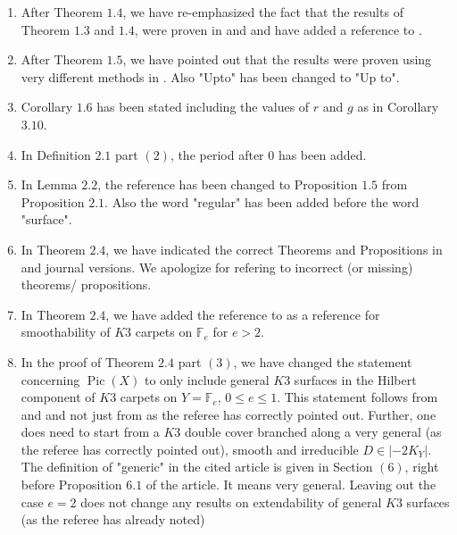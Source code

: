 \documentclass[11pt,twoside]{amsart}
\theoremstyle{plain}
\numberwithin{equation}{section}
\theoremstyle{definition}
\begin{document}
\begin{enumerate}

\item[$(1)$] After Theorem $1.4$, we have re-emphasized the fact that the results of Theorem $1.3$ and $1.4$, were proven in \cite{CLM93} and \cite{CLM98} and have added a reference to \cite{CLM98c}. 

\item[$(2)$] After Theorem $1.5$, we have pointed out that the results were proven using very different methods in \cite{CLM98}. Also "Upto" has been changed to "Up to".

\item[$(3)$] Corollary $1.6$ has been stated including the values of $r$ and $g$ as in Corollary $3.10$. 

\item[$(4)$] In Definition $2.1$ part $(2)$, the period after $0$ has been added. 

\item[$(5)$] In Lemma $2.2$, the reference has been changed to Proposition $1.5$ from Proposition $2.1$. Also the word "regular" has been added before the word "surface".

\item[$(6)$] In Theorem $2.4$, we have indicated the correct Theorems and Propositions in \cite{BMR21} and \cite{GP97} journal versions. We apologize for refering to incorrect (or missing) theorems/ propositions.

\item[$(7)$] In Theorem $2.4$, we have added the reference to \cite[Theorem $4.4$]{BMR21} as a reference for smoothability of $K3$ carpets on $\mathbb{F}_e$ for $e > 2$.

\item[$(8)$]  In the proof of Theorem $2.4$ part $(3)$, we have changed the statement concerning $\operatorname{Pic}(X)$ to only include general $K3$ surfaces in the Hilbert component of $K3$ carpets on $Y = \mathbb{F}_e$, $0 \leq e \leq 1$. This statement follows from \cite[Proposition $6.3$]{AHL10} and \cite[Proposition $6.5$ (i), (iii)]{AHL10} and not just from \cite[Proposition $6.3$]{AHL10} as the referee has correctly pointed out. Further, one does need to start from a $K3$ double cover branched along a very general (as the referee has correctly pointed out), smooth and irreducible $D \in |-2K_Y|$. The definition of "generic" in the cited article is given in Section $(6)$, right before Proposition $6.1$ of the article. It means very general. Leaving out the case $e = 2$ does not change any results on extendability of general $K3$ surfaces (as the referee has already noted)  


\end{enumerate}
\end{document}
